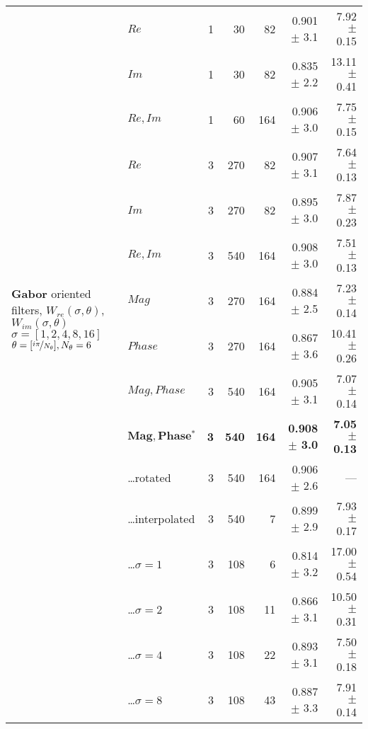 \begin{tabularx}{\linewidth}{p{3.1cm} p{3cm} r r r r r}
\midrule
\multirow{14}{3.1cm}{\centering
    \textbf{Gabor}
    \newline oriented filters,
    \newline
    \newline $W_{re}(\sigma,\theta)$, $W_{im}(\sigma,\theta)$
    \newline $\sigma = [1, 2, 4, 8, 16]$
    \newline $\theta = [ \nicefrac{i\pi}{N_\theta} ], N_\theta = 6$ }
        & $Re$                      & 1 &  30   & 82    & 0.901 $\pm$ 3.1   & 7.92 $\pm$ 0.15 \\
        & $Im$                      & 1 &  30   & 82    & 0.835 $\pm$ 2.2   &13.11 $\pm$ 0.41 \\
        & $Re,Im$                   & 1 &  60   &164    & 0.906 $\pm$ 3.0   & 7.75 $\pm$ 0.15 \\
        & $Re$                      & 3 & 270   & 82    & 0.907 $\pm$ 3.1   & 7.64 $\pm$ 0.13 \\
        & $Im$                      & 3 & 270   & 82    & 0.895 $\pm$ 3.0   & 7.87 $\pm$ 0.23 \\
        & $Re,Im$                   & 3 & 540   &164    & 0.908 $\pm$ 3.0   & 7.51 $\pm$ 0.13 \\
        & $Mag$                     & 3 & 270   &164    & 0.884 $\pm$ 2.5   & 7.23 $\pm$ 0.14 \\
        & $Phase$                   & 3 & 270   &164    & 0.867 $\pm$ 3.6   &10.41 $\pm$ 0.26 \\
        & $Mag,Phase$               & 3 & 540   &164    & 0.905 $\pm$ 3.1   & 7.07 $\pm$ 0.14 \\
        & $\mathbf{Mag, Phase{^*}}$ & \textbf{3} & \textbf{540} &\textbf{164} & \textbf{0.908 $\pm$ 3.0} & \textbf{7.05 $\pm$ 0.13} \\
        & \hspace{2mm} \ldots rotated
                                    & 3 & 540   &164    & 0.906 $\pm$ 2.6   & --- \\
        & \hspace{2mm} \ldots interpolated
                                    & 3 & 540   &  7    & 0.899 $\pm$ 2.9   & 7.93 $\pm$ 0.17 \\
        & \hspace{2mm} \ldots ${\sigma = 1}$
                                    & 3 & 108   &  6    & 0.814 $\pm$ 3.2   &17.00 $\pm$ 0.54 \\
        & \hspace{2mm} \ldots ${\sigma = 2}$
                                    & 3 & 108   & 11    & 0.866 $\pm$ 3.1   &10.50 $\pm$ 0.31 \\
        & \hspace{2mm} \ldots ${\sigma = 4}$
                                    & 3 & 108   & 22    & 0.893 $\pm$ 3.1   & 7.50 $\pm$ 0.18 \\
        & \hspace{2mm} \ldots ${\sigma = 8}$
                                    & 3 & 108   & 43    & 0.887 $\pm$ 3.3   & 7.91 $\pm$ 0.14 \\


\end{tabularx}
